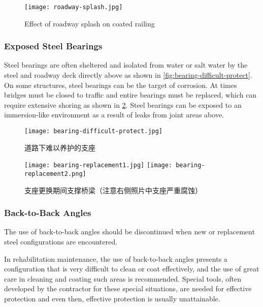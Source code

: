 \begin{figure}
  \texttt{[image: roadway-splash.jpg]}
  \caption{Effect of roadway splash on coated railing}
  \label{fig:roadway-splash}
\end{figure}

\subsubsection{Exposed Steel Bearings}
Steel bearings are often sheltered and isolated from water or salt water by the steel and roadway deck directly
above as shown in \cref{fig:bearing-difficult-protect}. On some structures, steel bearings can be the target of corrosion. At times bridges
must be closed to traffic and entire bearings must be replaced, which can require extensive shoring as shown in
\cref{fig:bearing-replacement}. Steel bearings can be exposed to an immersion-like environment as a result of leaks from joint areas
above.

\begin{figure}
  \begin{minipage}{0.3\linewidth}\centering
    \texttt{[image: bearing-difficult-protect.jpg]}
    \caption{道路下难以养护的支座}
    \label{fig:bearing-difficult-protect}
  \end{minipage}%
  \begin{minipage}{0.7\linewidth}
    \texttt{[image: bearing-replacement1.jpg]}\hfill
    \texttt{[image: bearing-replacement2.png]}
    \caption{支座更换期间支撑桥梁（注意右侧照片中支座严重腐蚀）}
    \label{fig:bearing-replacement}
  \end{minipage}
\end{figure}

\subsubsection{Back-to-Back Angles}
The use of back-to-back angles should be discontinued when new or replacement steel configurations are
encountered.

In rehabilitation maintenance, the use of back-to-back angles presents a configuration that is very difficult to
clean or coat effectively, and the use of great care in cleaning and coating such areas is recommended. Special tools,
often developed by the contractor for these special situations, are needed for effective protection and even then,
effective protection is usually unattainable.

